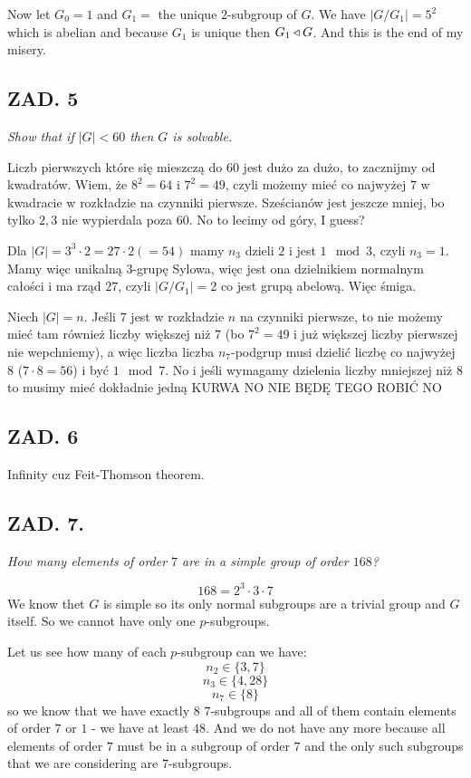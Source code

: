\documentclass{article}[13pt]
\begin{document}
Now let $G_0=1$ and $G_1=$ the unique $2$-subgroup of $G$. We have $|G/G_1|=5^2$ which is abelian and because $G_1$ is unique then $G_1\triangleleft G$. And this is the end of my misery.

\subsection*{ZAD. 5}

\emph{Show that if $|G|<60$ then $G$ is solvable.}
\medskip

Liczb pierwszych które się mieszczą do $60$ jest dużo za dużo, to zacznijmy od kwadratów. Wiem, że $8^2=64$ i $7^2=49$, czyli możemy mieć co najwyżej $7$ w kwadracie w rozkładzie na czynniki pierwsze. Sześcianów jest jeszcze mniej, bo tylko $2,3$ nie wypierdala poza $60$. No to lecimy od góry, I guess?

Dla $|G|=3^3\cdot2=27\cdot 2(=54)$ mamy $n_3$ dzieli $2$ i jest $1\mod3$, czyli $n_3=1$. Mamy więc unikalną $3$-grupę Sylowa, więc jest ona dzielnikiem normalnym całości i ma rząd $27$, czyli $|G/G_1|=2$ co jest grupą abelową. Więc śmiga.
\smallskip

Niech $|G|=n$. Jeśli $7$ jest w rozkładzie $n$ na czynniki pierwsze, to nie możemy mieć tam również liczby większej niż $7$ (bo $7^2=49$ i już większej liczby pierwszej nie wepchniemy), a więc liczba liczba $n_7$-podgrup musi dzielić liczbę co najwyżej $8$ ($7\cdot8=56$) i być $1\mod7$. No i jeśli wymagamy dzielenia liczby mniejszej niż $8$ to musimy mieć dokładnie jedną KURWA NO NIE BĘDĘ TEGO ROBIĆ NO


\subsection*{ZAD. 6}

Infinity cuz Feit-Thomson theorem.

\subsection*{ZAD. 7.}

\emph{How many elements of order $7$ are in a simple group of order $168$?}

$$168=2^3\cdot 3\cdot7$$
We know thet $G$ is simple so its only normal subgroups are a trivial group and $G$ itself. So we cannot have only one $p$-subgroups.

Let us see how many of each $p$-subgroup can we have:
$$n_2\in\{3, 7\}$$
$$n_3\in\{4, 28\}$$
$$n_7\in\{8\}$$
so we know that we have exactly $8$ $7$-subgroups and all of them contain elements of order $7$ or $1$ - we have at least $48$. And we do not have any more because all elements of order $7$ must be in a subgroup of order $7$ and the only such subgroups that we are considering are $7$-subgroups.
\end{document}
